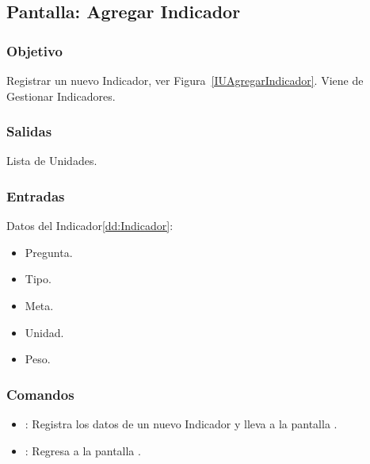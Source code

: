\subsection{Pantalla: Agregar Indicador}

\subsubsection{Objetivo}
Registrar un nuevo Indicador, ver Figura~\ref{IUAgregarIndicador}. Viene de Gestionar Indicadores.


\subsubsection{Salidas}

 Lista de Unidades.

\subsubsection{Entradas}
 Datos del Indicador\ref{dd:Indicador}:
 \begin{itemize}
  \item Pregunta.
  \item Tipo.
  \item Meta.
  \item Unidad.
  \item Peso.
 \end{itemize}

\subsubsection{Comandos}
\begin{itemize}
 \item {}: Registra los datos de un nuevo Indicador y lleva a la pantalla .
 \item {}: Regresa a la pantalla .
\end{itemize}
